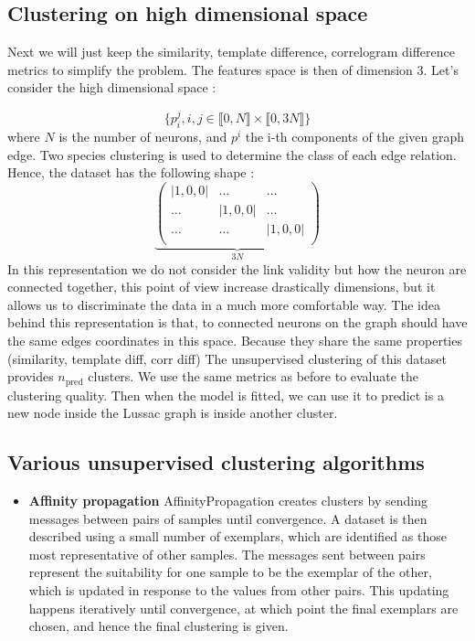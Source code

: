 \documentclass[11pt,a4paper]{report}
\begin{document}
\begin{multicols}{2}
    \section{Clustering on high dimensional space}
    Next we will just keep the similarity, template difference, correlogram difference metrics to simplify the problem. The features space is then of dimension 3.
    Let's consider the high dimensional space :

    $$\{p_i^j, i,j \in \llbracket 0, N \rrbracket \times \llbracket 0,3 N \rrbracket\}$$ where $N$ is the number of neurons, and $p^i$ the i-th components of the given graph edge.
    Two species clustering is used to determine the class of each edge relation. Hence, the dataset has the following shape :
    $$
        \underbrace{
            \begin{pmatrix}
                |1,0,0| & \dots   & \dots   \\
                \dots   & |1,0,0| & \dots   \\
                \dots   & \dots   & |1,0,0| \\
            \end{pmatrix}}_{3N}
    $$
    In this representation we do not consider the link validity but how the neuron are connected together, this point of view increase drastically dimensions, but it allows us
    to discriminate the data in a much more comfortable way. The idea behind this representation is that, to connected neurons on the graph should have the same edges coordinates in this space. Because
    they share the same properties (similarity, template diff, corr diff)
    The unsupervised clustering of this dataset provides $n_{\text{pred}}$ clusters. We use the same metrics as before to evaluate the clustering quality. Then when the model is fitted, we can use it to predict is a new node inside the Lussac graph is inside another cluster.

    \subsection{Various unsupervised clustering algorithms}


    \begin{itemize}
        \item \textbf{Affinity propagation}
              AffinityPropagation creates clusters by sending messages between pairs of samples until convergence.
              A dataset is then described using a small number of exemplars, which are identified as those most representative of other samples.
              The messages sent between pairs represent the suitability for one sample to be the exemplar of the other, which is updated in response to the values from other pairs.
              This updating happens iteratively until convergence,
              at which point the final exemplars are chosen, and hence the final clustering is given.


\end{itemize}
\end{multicols}
\end{document}
